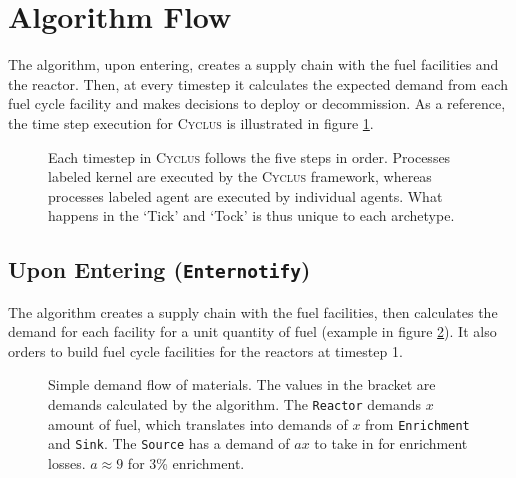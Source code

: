 \documentclass[11pt,letterpaper]{article}
\newcommand{\Cyclus}{\textsc{Cyclus}\xspace}%
\begin{document}
\section{Algorithm Flow}

The algorithm, upon entering, creates a supply chain with the fuel facilities and
the reactor. Then, at every timestep it calculates the expected demand from each fuel cycle
facility and makes decisions to deploy or decommission. As a reference, the time step
execution for \Cyclus is illustrated in figure \ref{diag:time}.

\begin{figure}[H]
\centering
{}
\caption{Each timestep in \Cyclus follows the five steps in order. Processes labeled
         kernel are executed by the \Cyclus framework, whereas processes labeled agent
         are executed by individual agents. What happens in the `Tick' and `Tock' is
         thus unique to each archetype.}
\label{diag:time}
\end{figure}

\subsection{Upon Entering (\texttt{Enternotify})}

The algorithm creates a supply chain with the fuel facilities,
then calculates the demand for each facility for a unit quantity of fuel
(example in figure \ref{diag:dem}). It also orders to build fuel cycle
facilities for the reactors at timestep 1.

\begin{figure}[H]
\caption{Simple demand flow of materials. The values in the bracket are demands calculated
         by the algorithm. The \texttt{Reactor} demands $x$ amount of fuel,
         which translates into demands of $x$ from \texttt{Enrichment} and \texttt{Sink}.
         The \texttt{Source} has a demand of $a x$ to take in for enrichment losses.
         $a \approx 9 $ for 3\% enrichment.}
\label{diag:dem}
\end{figure}
\end{document}
